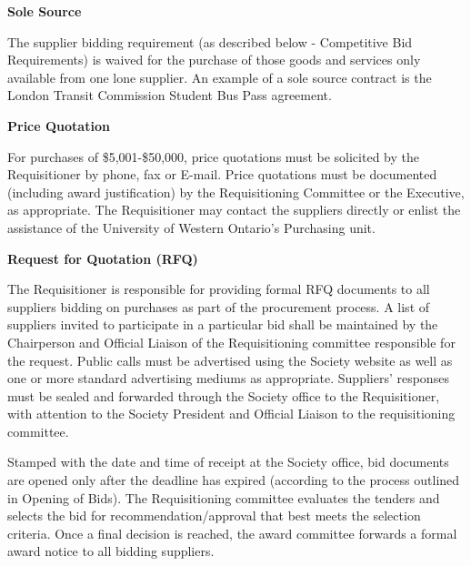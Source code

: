 \begin{longenum}[label*=\thesection.\arabic*., align=left]
\item \textbf{Sole Source}
\begin{longenum} [label*=\arabic*., align=left]
	\item The supplier bidding requirement (as described below - Competitive Bid Requirements) is waived for the purchase of those goods and services only available from one lone supplier. An example of a sole source contract is the London Transit Commission Student Bus Pass agreement.
\end{longenum}

\item \textbf{Price Quotation}

\begin{longenum} [label*=\arabic*., align=left]
		\item For purchases of \$5,001-\$50,000, price quotations must be solicited by the Requisitioner by phone, fax or E-mail. Price quotations must be documented (including award justification) by the Requisitioning Committee or the Executive, as appropriate. The Requisitioner may contact the suppliers directly or enlist the assistance of the University of Western Ontario's Purchasing unit.
		
\end{longenum}

\item \textbf{Request for Quotation (RFQ)}

\begin{longenum} [label*=\arabic*., align=left]
		\item The Requisitioner is responsible for providing formal RFQ documents to all suppliers bidding on purchases as part of the procurement process. A list of suppliers invited to participate in a particular bid shall be maintained by the Chairperson and Official Liaison of the Requisitioning committee responsible for the request. Public calls must be advertised using the Society website as well as one or more standard advertising mediums as appropriate. Suppliers' responses must be sealed and forwarded through the Society office to the Requisitioner, with attention to the Society President and Official Liaison to the requisitioning committee.
		
	\item	Stamped with the date and time of receipt at the Society office, bid documents are opened only after the deadline has expired (according to the process outlined in Opening of Bids). The Requisitioning committee evaluates the tenders and selects the bid for recommendation/approval that best meets the selection criteria. Once a final decision is reached, the award committee forwards a formal award notice to all bidding suppliers.
		

\end{longenum}
\end{longenum}
